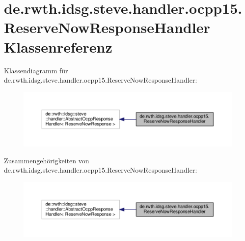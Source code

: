 \hypertarget{classde_1_1rwth_1_1idsg_1_1steve_1_1handler_1_1ocpp15_1_1_reserve_now_response_handler}{\section{de.\-rwth.\-idsg.\-steve.\-handler.\-ocpp15.\-Reserve\-Now\-Response\-Handler Klassenreferenz}
\label{classde_1_1rwth_1_1idsg_1_1steve_1_1handler_1_1ocpp15_1_1_reserve_now_response_handler}
}


Klassendiagramm für de.\-rwth.\-idsg.\-steve.\-handler.\-ocpp15.\-Reserve\-Now\-Response\-Handler\-:
\nopagebreak
\begin{figure}[H]
\begin{center}
\leavevmode
\includegraphics[width=350pt]{classde_1_1rwth_1_1idsg_1_1steve_1_1handler_1_1ocpp15_1_1_reserve_now_response_handler__inherit__graph}
\end{center}
\end{figure}


Zusammengehörigkeiten von de.\-rwth.\-idsg.\-steve.\-handler.\-ocpp15.\-Reserve\-Now\-Response\-Handler\-:
\nopagebreak
\begin{figure}[H]
\begin{center}
\leavevmode
\includegraphics[width=350pt]{classde_1_1rwth_1_1idsg_1_1steve_1_1handler_1_1ocpp15_1_1_reserve_now_response_handler__coll__graph}
\end{center}
\end{figure}
